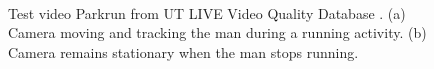 \documentclass{book}
\begin{document}
\begin{figure}[b!]
	\centering
	 \\
	\caption{\label{fig:parkrun}
		Test video Parkrun from UT LIVE Video Quality Database \cite{Kalpana}.
		(a) Camera moving and tracking the man during a running activity.
		(b) Camera remains stationary when the man stops running.}
\end{figure}
\end{document}
